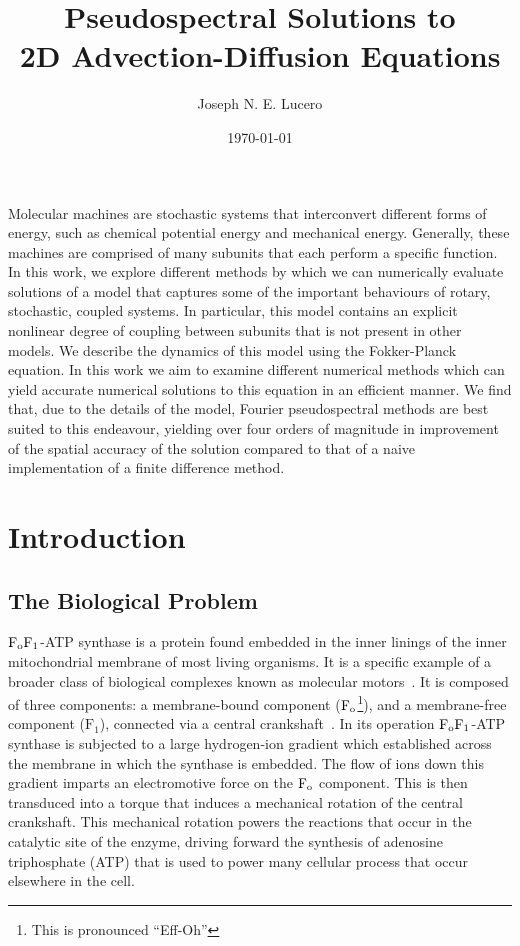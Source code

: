 \documentclass[11pt]{article}
\title{Pseudospectral Solutions to \\ 2D Advection-Diffusion Equations}
\author{Joseph N. E. Lucero}
\date{\today}
\newcommand{\fo}{\mathrm{F}_{\rm o}}
\newcommand{\fI}{\mathrm{F}_{1}}
\newcommand{\fofI}{\mathrm{F}_{\rm o}\mathrm{F}_{1}}
\begin{document}
\maketitle

Molecular machines are stochastic systems that interconvert different forms of energy, such as chemical potential 
energy and mechanical energy. Generally, these machines are comprised of many subunits that each perform a specific
function. In this work, we explore different methods by which we can numerically evaluate solutions of a model that 
captures some of the important behaviours of rotary, stochastic, coupled systems. In particular, this model contains an 
explicit nonlinear degree of coupling between subunits that is not present in other models. We describe the dynamics of 
this model using the Fokker-Planck equation. In this work we aim to examine different numerical methods which can yield
accurate numerical solutions to this equation in an efficient manner. We find that, due to the details of the model, 
Fourier pseudospectral methods are best suited to this endeavour, yielding over four orders of magnitude in improvement 
of the spatial accuracy of the solution compared to that of a naive implementation of a finite difference method. 

\section{Introduction}

\subsection{The Biological Problem}

$\fofI$-ATP synthase is a protein found embedded in the inner linings of the inner mitochondrial membrane of 
most living organisms. It is a specific example of a broader class of biological complexes known as molecular motors~\cite{Kolomeisky2013}.
It is composed of three components: a membrane-bound component ($\fo$\footnote{This is pronounced ``Eff-Oh''}), 
and a membrane-free component ($\fI$), connected via a 
central crankshaft~\cite{Okuno2011}. In its operation $\fofI$-ATP synthase is subjected to a large hydrogen-ion gradient 
which established across the membrane in which the synthase is embedded. The flow of ions down this 
gradient imparts an electromotive force on the $\fo$ component. This is then transduced into a torque that 
induces a mechanical rotation of the central crankshaft. This mechanical rotation powers the reactions that 
occur in the catalytic site of the enzyme, driving forward the synthesis of adenosine triphosphate (ATP) that is used
to power many cellular process that occur elsewhere in the cell.
\end{document}
